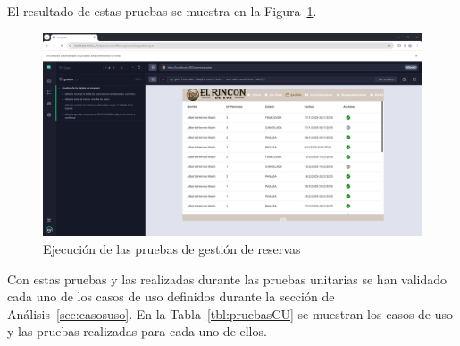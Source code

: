\begin{itemize}
      El resultado de estas pruebas se muestra en la Figura~\ref{fig:pruebas-gestion}.
        \begin{figure}[h!tb]
        \centering
        \includegraphics[width=1\textwidth]{figs/pruebasGestion.png}
        \caption{Ejecución de las pruebas de gestión de reservas}
        \label{fig:pruebas-gestion}
        \end{figure}
    \end{itemize}
Con estas pruebas y las realizadas durante las pruebas unitarias se han validado cada uno de los casos de uso definidos durante la sección de Análisis~\ref{sec:casosuso}. En la Tabla~\ref{tbl:pruebasCU} se muestran los casos de uso y las pruebas realizadas para cada uno de ellos.
	
